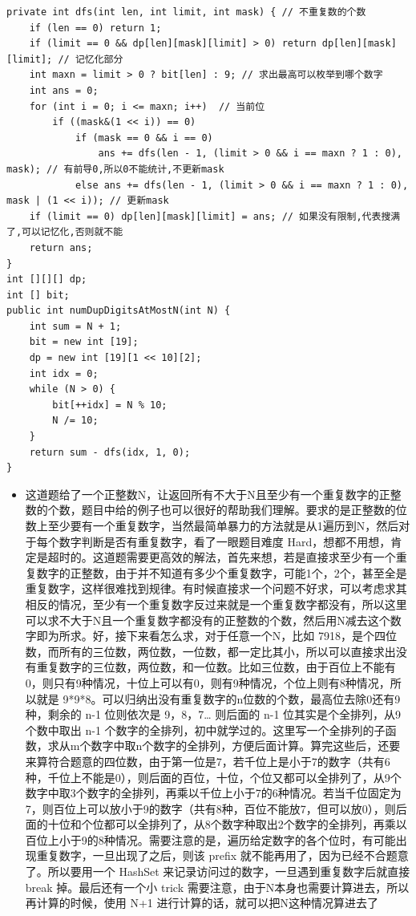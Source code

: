 \documentclass[9pt, b5paaper]{book}
\begin{document}
\begin{verbatim}
private int dfs(int len, int limit, int mask) { // 不重复数的个数
    if (len == 0) return 1;
    if (limit == 0 && dp[len][mask][limit] > 0) return dp[len][mask][limit]; // 记忆化部分
    int maxn = limit > 0 ? bit[len] : 9; // 求出最高可以枚举到哪个数字
    int ans = 0;
    for (int i = 0; i <= maxn; i++)  // 当前位
        if ((mask&(1 << i)) == 0)
            if (mask == 0 && i == 0)
                ans += dfs(len - 1, (limit > 0 && i == maxn ? 1 : 0), mask); // 有前导0,所以0不能统计,不更新mask
            else ans += dfs(len - 1, (limit > 0 && i == maxn ? 1 : 0), mask | (1 << i)); // 更新mask
    if (limit == 0) dp[len][mask][limit] = ans; // 如果没有限制,代表搜满了,可以记忆化,否则就不能
    return ans;
}
int [][][] dp;
int [] bit;
public int numDupDigitsAtMostN(int N) {
    int sum = N + 1;
    bit = new int [19];
    dp = new int [19][1 << 10][2];
    int idx = 0;
    while (N > 0) {
        bit[++idx] = N % 10;
        N /= 10;
    }
    return sum - dfs(idx, 1, 0);
}
\end{verbatim}
\begin{itemize}
\item 这道题给了一个正整数N，让返回所有不大于N且至少有一个重复数字的正整数的个数，题目中给的例子也可以很好的帮助我们理解。要求的是正整数的位数上至少要有一个重复数字，当然最简单暴力的方法就是从1遍历到N，然后对于每个数字判断是否有重复数字，看了一眼题目难度 Hard，想都不用想，肯定是超时的。这道题需要更高效的解法，首先来想，若是直接求至少有一个重复数字的正整数，由于并不知道有多少个重复数字，可能1个，2个，甚至全是重复数字，这样很难找到规律。有时候直接求一个问题不好求，可以考虑求其相反的情况，至少有一个重复数字反过来就是一个重复数字都没有，所以这里可以求不大于N且一个重复数字都没有的正整数的个数，然后用N减去这个数字即为所求。好，接下来看怎么求，对于任意一个N，比如 7918，是个四位数，而所有的三位数，两位数，一位数，都一定比其小，所以可以直接求出没有重复数字的三位数，两位数，和一位数。比如三位数，由于百位上不能有0，则只有9种情况，十位上可以有0，则有9种情况，个位上则有8种情况，所以就是 9*9*8。可以归纳出没有重复数字的n位数的个数，最高位去除0还有9种，剩余的 n-1 位则依次是 9，8，7\ldots{} 则后面的 n-1 位其实是个全排列，从9个数中取出 n-1 个数字的全排列，初中就学过的。这里写一个全排列的子函数，求从m个数字中取n个数字的全排列，方便后面计算。算完这些后，还要来算符合题意的四位数，由于第一位是7，若千位上是小于7的数字（共有6种，千位上不能是0），则后面的百位，十位，个位又都可以全排列了，从9个数字中取3个数字的全排列，再乘以千位上小于7的6种情况。若当千位固定为7，则百位上可以放小于9的数字（共有8种，百位不能放7，但可以放0），则后面的十位和个位都可以全排列了，从8个数字种取出2个数字的全排列，再乘以百位上小于9的8种情况。需要注意的是，遍历给定数字的各个位时，有可能出现重复数字，一旦出现了之后，则该 prefix 就不能再用了，因为已经不合题意了。所以要用一个 HashSet 来记录访问过的数字，一旦遇到重复数字后就直接 break 掉。最后还有一个小 trick 需要注意，由于N本身也需要计算进去，所以再计算的时候，使用 N+1 进行计算的话，就可以把N这种情况算进去了
\end{itemize}
\end{document}
